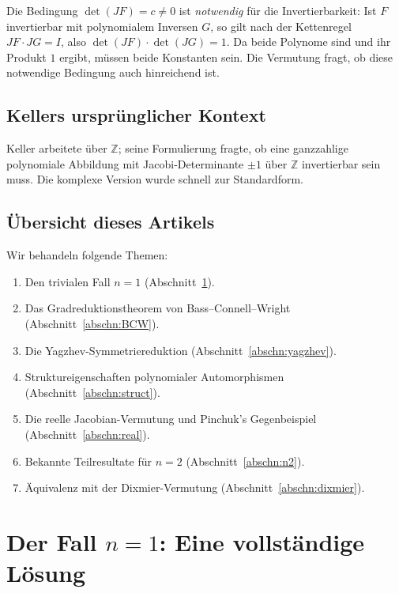 \documentclass[12pt,a4paper]{amsart}
\theoremstyle{definition}
\theoremstyle{remark}
\begin{document}
Die Bedingung $\det(JF) = c \neq 0$ ist \emph{notwendig} für die Invertierbarkeit:
Ist $F$ invertierbar mit polynomialem Inversen $G$, so gilt nach der Kettenregel
$JF \cdot JG = I$, also $\det(JF) \cdot \det(JG) = 1$. Da beide Polynome sind und
ihr Produkt $1$ ergibt, müssen beide Konstanten sein.
Die Vermutung fragt, ob diese notwendige Bedingung auch hinreichend ist.

\subsection{Kellers ursprünglicher Kontext}

Keller arbeitete über $\mathbb{Z}$; seine Formulierung fragte, ob eine ganzzahlige
polynomiale Abbildung mit Jacobi-Determinante $\pm 1$ über $\mathbb{Z}$ invertierbar
sein muss. Die komplexe Version wurde schnell zur Standardform.

\subsection{Übersicht dieses Artikels}

Wir behandeln folgende Themen:
\begin{enumerate}[label=(\roman*)]
  \item Den trivialen Fall $n = 1$ (Abschnitt~\ref{abschn:n1}).
  \item Das Gradreduktionstheorem von Bass--Connell--Wright (Abschnitt~\ref{abschn:BCW}).
  \item Die Yagzhev-Symmetriereduktion (Abschnitt~\ref{abschn:yagzhev}).
  \item Struktureigenschaften polynomialer Automorphismen (Abschnitt~\ref{abschn:struct}).
  \item Die reelle Jacobian-Vermutung und Pinchuk's Gegenbeispiel (Abschnitt~\ref{abschn:real}).
  \item Bekannte Teilresultate für $n = 2$ (Abschnitt~\ref{abschn:n2}).
  \item Äquivalenz mit der Dixmier-Vermutung (Abschnitt~\ref{abschn:dixmier}).
\end{enumerate}

\section{Der Fall \texorpdfstring{$n=1$}{n=1}: Eine vollständige Lösung}
\label{abschn:n1}
\end{document}
